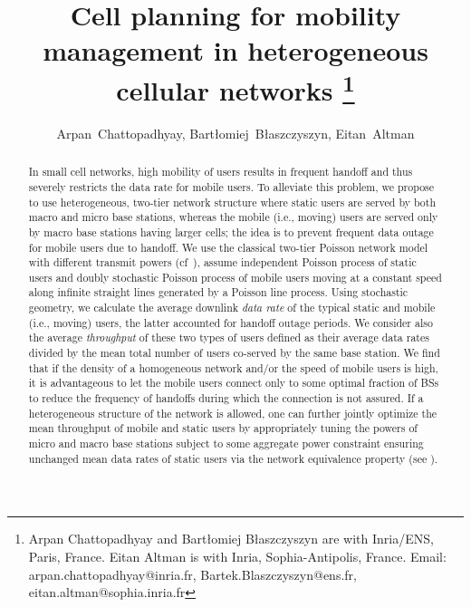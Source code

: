 \documentclass[10pt,journal]{IEEEtran}
\begin{document}
 \title{Cell planning for mobility management
        in heterogeneous cellular networks
 \thanks{Arpan Chattopadhyay and  Bart{\l}omiej B{\l}aszczyszyn are with Inria/ENS, Paris, France. Eitan Altman is 
 with Inria, Sophia-Antipolis, France. Email: arpan.chattopadhyay@inria.fr, Bartek.Blaszczyszyn@ens.fr,
 eitan.altman@sophia.inria.fr}
}





\author{
Arpan~Chattopadhyay, Bart{\l}omiej~B{\l}aszczyszyn, Eitan~Altman \\
}


\maketitle
\thispagestyle{empty}



\begin{abstract}
In small cell networks, high mobility of users 
results in frequent handoff and thus severely restricts the data rate for mobile users. 
To alleviate this problem, we
propose to use heterogeneous, two-tier  network structure 
where static users are served by both macro and micro base stations,
whereas the mobile (i.e., moving) users are served only by macro base stations having
larger cells; the idea is to prevent frequent data outage for mobile
users due to handoff.
We use the classical two-tier Poisson network model with different
transmit powers (cf~\cite{DHILLON2012}), assume independent Poisson process of
static users and doubly stochastic Poisson process of mobile users 
moving at a constant speed along infinite straight lines generated by
a Poisson line process.
Using stochastic geometry, we calculate the  average downlink {\em data
  rate}  of the typical static and mobile (i.e., moving) 
users, the latter accounted for handoff outage periods. We consider
also the average {\em throughput} of these two types of users defined as
their average data rates divided by the mean total number of users
co-served by the same base station. We find  that  if 
 the density of a homogeneous network and/or the speed of mobile users is high, 
it is advantageous to let the mobile users
connect only to some optimal fraction  of BSs to reduce the frequency
of handoffs during which  the connection is
not assured. If a heterogeneous structure of the  network is allowed,
 one can further jointly optimize the mean throughput of mobile and static  users by 
appropriately tuning the powers  of micro and macro base stations
subject to some aggregate power constraint ensuring unchanged  mean data rates of
static users via the network equivalence property (see \cite{netequivalence}).

\end{abstract}
\end{document}
